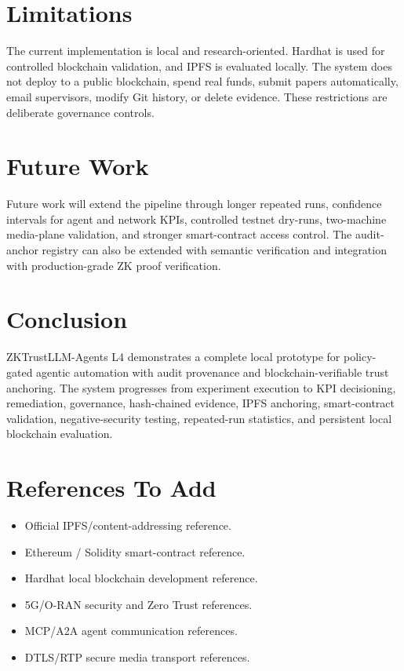 \documentclass[10pt]{article}
\begin{document}
\section{Limitations}
The current implementation is local and research-oriented. Hardhat is used for controlled blockchain validation, and IPFS is evaluated locally. The system does not deploy to a public blockchain, spend real funds, submit papers automatically, email supervisors, modify Git history, or delete evidence. These restrictions are deliberate governance controls.
\section{Future Work}
Future work will extend the pipeline through longer repeated runs, confidence intervals for agent and network KPIs, controlled testnet dry-runs, two-machine media-plane validation, and stronger smart-contract access control. The audit-anchor registry can also be extended with semantic verification and integration with production-grade ZK proof verification.
\section{Conclusion}
ZKTrustLLM-Agents L4 demonstrates a complete local prototype for policy-gated agentic automation with audit provenance and blockchain-verifiable trust anchoring. The system progresses from experiment execution to KPI decisioning, remediation, governance, hash-chained evidence, IPFS anchoring, smart-contract validation, negative-security testing, repeated-run statistics, and persistent local blockchain evaluation.
\section*{References To Add}
\begin{itemize}
\item Official IPFS/content-addressing reference.
\item Ethereum / Solidity smart-contract reference.
\item Hardhat local blockchain development reference.
\item 5G/O-RAN security and Zero Trust references.
\item MCP/A2A agent communication references.
\item DTLS/RTP secure media transport references.
\end{itemize}
\end{document}
